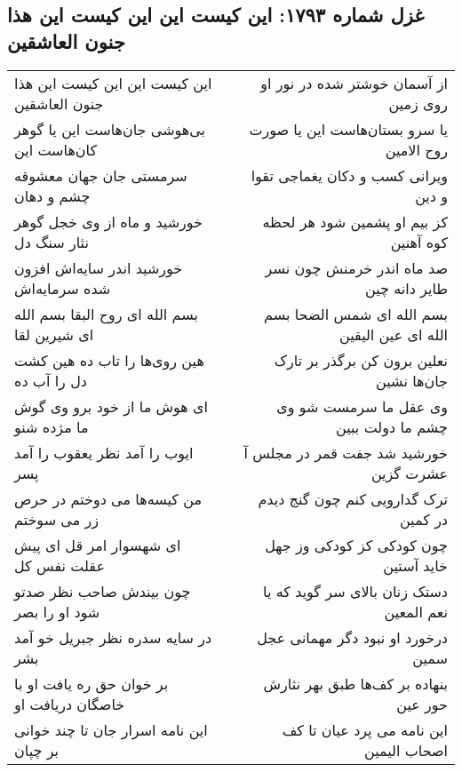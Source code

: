 \begin{center}
\section*{غزل شماره ۱۷۹۳: این کیست این این کیست این هذا جنون العاشقین}
\label{sec:1793}
\begin{longtable}{l p{0.5cm} r}
این کیست این این کیست این هذا جنون العاشقین
&&
از آسمان خوشتر شده در نور او روی زمین
\\
بی‌هوشی جان‌هاست این یا گوهر کان‌هاست این
&&
یا سرو بستان‌هاست این یا صورت روح الامین
\\
سرمستی جان جهان معشوقه چشم و دهان
&&
ویرانی کسب و دکان یغماجی تقوا و دین
\\
خورشید و ماه از وی خجل گوهر نثار سنگ دل
&&
کز بیم او پشمین شود هر لحظه کوه آهنین
\\
خورشید اندر سایه‌اش افزون شده سرمایه‌اش
&&
صد ماه اندر خرمنش چون نسر طایر دانه چین
\\
بسم الله ای روح البقا بسم الله ای شیرین لقا
&&
بسم الله ای شمس الضحا بسم الله ای عین الیقین
\\
هین روی‌ها را تاب ده هین کشت دل را آب ده
&&
نعلین برون کن برگذر بر تارک جان‌ها نشین
\\
ای هوش ما از خود برو وی گوش ما مژده شنو
&&
وی عقل ما سرمست شو وی چشم ما دولت ببین
\\
ایوب را آمد نظر یعقوب را آمد پسر
&&
خورشید شد جفت قمر در مجلس آ عشرت گزین
\\
من کیسه‌ها می دوختم در حرص زر می سوختم
&&
ترک گدارویی کنم چون گنج دیدم در کمین
\\
ای شهسوار امر قل ای پیش عقلت نفس کل
&&
چون کودکی کز کودکی وز جهل خاید آستین
\\
چون بیندش صاحب نظر صدتو شود او را بصر
&&
دستک زنان بالای سر گوید که یا نعم المعین
\\
در سایه سدره نظر جبریل خو آمد بشر
&&
درخورد او نبود دگر مهمانی عجل سمین
\\
بر خوان حق ره یافت او با خاصگان دریافت او
&&
بنهاده بر کف‌ها طبق بهر نثارش حور عین
\\
این نامه اسرار جان تا چند خوانی بر چپان
&&
این نامه می پرد عیان تا کف اصحاب الیمین
\\
\end{longtable}
\end{center}
